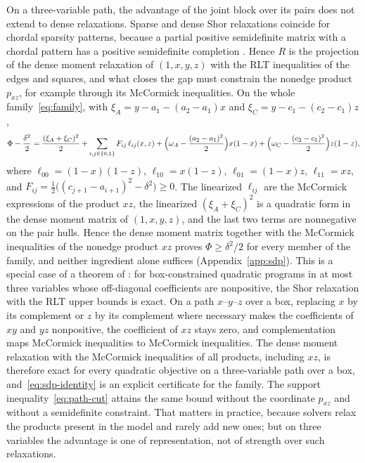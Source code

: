 On a three-variable path, the advantage of the joint block over its pairs
does not extend to dense relaxations. Sparse and dense Shor relaxations \citep{Shor1987} coincide
for chordal sparsity patterns, because a partial positive semidefinite
matrix with a chordal pattern has a positive semidefinite completion
\citep{GroneEtAl1984,WakiEtAl2006,Laurent2009}. Hence $R$ is the projection of
the dense moment relaxation of $(1,x,y,z)$ with the RLT inequalities
\citep{SheraliAdams1990,SheraliTuncbilek1992} of the edges and squares, and
what closes the gap must constrain the nonedge product $p_{xz}$, for example
through its McCormick inequalities. On the whole family~\eqref{eq:family}, with
$\xi_A=y-a_1-(a_2-a_1)x$ and $\xi_C=y-c_1-(c_2-c_1)z$,
\begin{equation}\label{eq:sdp-identity}
\Phi-\frac{\delta^2}2=\frac{(\xi_A+\xi_C)^2}2+\sum_{i,j\in\{0,1\}}F_{ij}\,\ell_{ij}(x,z)
+\Bigl(\omega_A-\frac{(a_2-a_1)^2}2\Bigr)x(1-x)+\Bigl(\omega_C-\frac{(c_2-c_1)^2}2\Bigr)z(1-z),
\end{equation}
where $\ell_{00}=(1-x)(1-z)$, $\ell_{10}=x(1-z)$, $\ell_{01}=(1-x)z$,
$\ell_{11}=xz$, and $F_{ij}=\tfrac12\bigl((c_{j+1}-a_{i+1})^2-\delta^2\bigr)\ge0$.
The linearized $\ell_{ij}$ are the McCormick expressions of the product $xz$,
the linearized $(\xi_A+\xi_C)^2$ is a quadratic form in the dense moment matrix
of $(1,x,y,z)$, and the last two terms are nonnegative on the pair hulls.
Hence the dense moment matrix together with the McCormick inequalities of
the nonedge product $xz$ proves $\Phi\ge\delta^2/2$ for every member of the
family, and neither ingredient alone suffices (Appendix~\ref{app:sdp}). This
is a special case of a theorem of \citet[Theorem~1]{BurerNatarajanWillemsen2025}:
for box-constrained quadratic programs in at most three variables whose
off-diagonal coefficients are nonpositive, the Shor relaxation with the RLT
upper bounds is exact. On a path $x$--$y$--$z$ over a box, replacing $x$ by
its complement or $z$ by its complement where necessary makes the
coefficients of $xy$ and $yz$ nonpositive, the coefficient of $xz$ stays zero,
and complementation maps McCormick inequalities to McCormick inequalities.
The dense moment relaxation with the McCormick inequalities of all products,
including $xz$, is therefore exact for every quadratic objective on a
three-variable path over a box, and~\eqref{eq:sdp-identity} is an explicit
certificate for the family. The support inequality~\eqref{eq:path-cut}
attains the same bound without the coordinate $p_{xz}$ and without a
semidefinite constraint. That matters in practice, because solvers relax the
products present in the model and rarely add new ones; but on three variables
the advantage is one of representation, not of strength over such
relaxations.


